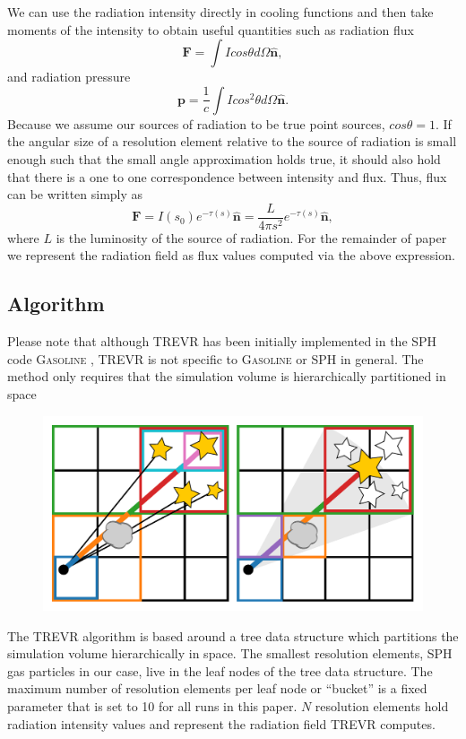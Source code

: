 \documentclass[fleq,usenatbib]{mnras}
\newcommand{\acro}{TREVR}
\begin{document}
We can use the radiation intensity directly in cooling functions and then take 
moments of the intensity to obtain useful quantities such as radiation flux 
\begin{equation}
\label{eqn:flux}
\mathbf{F} = \int I cos\theta d\Omega \mathbf{\hat{n}},
\end{equation}
and radiation pressure
\begin{equation}
\label{eqn:pressure}
\mathbf{p} = \frac{1}{c}\int I cos^2\theta d\Omega \mathbf{\hat{n}}.
\end{equation}
Because we assume our sources of radiation to be true point sources, 
$cos\theta = 1$. If the angular size of a resolution element relative to the 
source of radiation is small enough such that the small angle approximation 
holds true, it should also hold that there is a one to one correspondence 
between intensity and flux. Thus, flux can be written simply as 
\begin{equation}
\label{eqn:simpflux}
\mathbf{F} = I(s_0)e^{-\tau(s)} \mathbf{\hat{n}} = \frac{L}{4\pi s^2}
e^{-\tau(s)} \mathbf{\hat{n}},
\end{equation}
where $L$ is the luminosity of the source of radiation. For the remainder of 
paper we represent the radiation field as flux values computed via the above 
expression. 

\subsection{Algorithm}\label{sec:algo}
Please note that although \acro{} has been initially implemented in the 
SPH code \textsc{Gasoline} \citep{wadsleyEt03}, \acro{} is not specific to 
\textsc{Gasoline} or SPH in general. The method only requires that the 
simulation volume is hierarchically partitioned in space
 
\begin{figure}
\includegraphics[width=1\linewidth]{Figures/algorithm.pdf}
\caption{}
\label{fig:algorithm}
\end{figure}
The \acro{} algorithm is based around a tree data structure which partitions 
the simulation volume hierarchically in space. The smallest resolution 
elements, SPH gas particles in our case, live in the leaf nodes of the tree
data structure. The maximum number of resolution elements per leaf node or 
``bucket'' is a fixed parameter that is set to 10 for all runs in this 
paper. $N$ resolution elements hold radiation intensity values and 
represent the radiation field \acro{} computes. 
\end{document}
